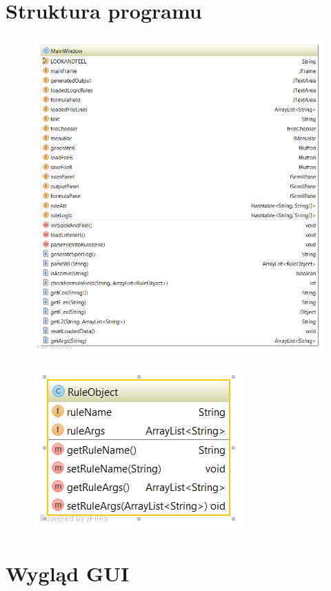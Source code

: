 \documentclass[a4paper, 11pt]{article}
\begin{document}
	\section{Struktura programu}
	\begin{figure}[H]
		\centerline{\includegraphics[scale=0.6]{diagram}}

	\end{figure}%
	\begin{figure}[H]
		\centerline{\includegraphics[scale=0.6]{diagram2}}

	\end{figure}%
	\section{Wygląd GUI}
	
\end{document}
